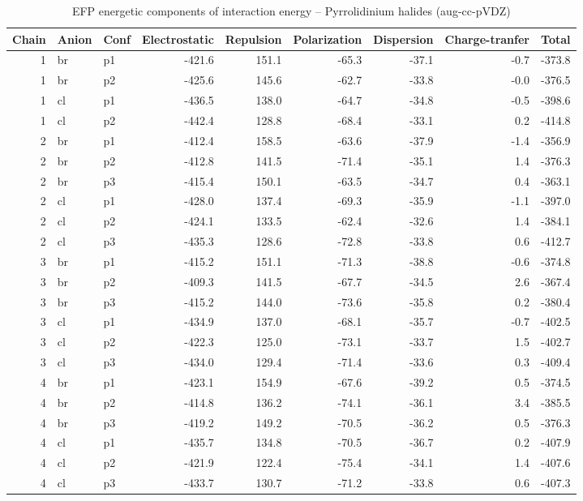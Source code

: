 \documentclass[a4paper]{article}
\begin{document}
\begin{table}[ht]
\centering
\footnotesize
\caption{EFP energetic components of interaction energy -- Pyrrolidinium halides (aug-cc-pVDZ)}
\begin{tabular}{rllrrrrrr}
  \hline
Chain & Anion & Conf & Electrostatic & Repulsion & Polarization & Dispersion & Charge-tranfer & Total \\ 
  \hline
 1 & br & p1 & -421.6 & 151.1 & -65.3 & -37.1 & -0.7 & -373.8 \\ 
   1 & br & p2 & -425.6 & 145.6 & -62.7 & -33.8 & -0.0 & -376.5 \\ 
   1 & cl & p1 & -436.5 & 138.0 & -64.7 & -34.8 & -0.5 & -398.6 \\ 
   1 & cl & p2 & -442.4 & 128.8 & -68.4 & -33.1 & 0.2 & -414.8 \\ 
   2 & br & p1 & -412.4 & 158.5 & -63.6 & -37.9 & -1.4 & -356.9 \\ 
   2 & br & p2 & -412.8 & 141.5 & -71.4 & -35.1 & 1.4 & -376.3 \\ 
   2 & br & p3 & -415.4 & 150.1 & -63.5 & -34.7 & 0.4 & -363.1 \\ 
   2 & cl & p1 & -428.0 & 137.4 & -69.3 & -35.9 & -1.1 & -397.0 \\ 
   2 & cl & p2 & -424.1 & 133.5 & -62.4 & -32.6 & 1.4 & -384.1 \\ 
   2 & cl & p3 & -435.3 & 128.6 & -72.8 & -33.8 & 0.6 & -412.7 \\ 
   3 & br & p1 & -415.2 & 151.1 & -71.3 & -38.8 & -0.6 & -374.8 \\ 
   3 & br & p2 & -409.3 & 141.5 & -67.7 & -34.5 & 2.6 & -367.4 \\ 
   3 & br & p3 & -415.2 & 144.0 & -73.6 & -35.8 & 0.2 & -380.4 \\ 
   3 & cl & p1 & -434.9 & 137.0 & -68.1 & -35.7 & -0.7 & -402.5 \\ 
   3 & cl & p2 & -422.3 & 125.0 & -73.1 & -33.7 & 1.5 & -402.7 \\ 
   3 & cl & p3 & -434.0 & 129.4 & -71.4 & -33.6 & 0.3 & -409.4 \\ 
   4 & br & p1 & -423.1 & 154.9 & -67.6 & -39.2 & 0.5 & -374.5 \\ 
   4 & br & p2 & -414.8 & 136.2 & -74.1 & -36.1 & 3.4 & -385.5 \\ 
   4 & br & p3 & -419.2 & 149.2 & -70.5 & -36.2 & 0.5 & -376.3 \\ 
   4 & cl & p1 & -435.7 & 134.8 & -70.5 & -36.7 & 0.2 & -407.9 \\ 
   4 & cl & p2 & -421.9 & 122.4 & -75.4 & -34.1 & 1.4 & -407.6 \\ 
   4 & cl & p3 & -433.7 & 130.7 & -71.2 & -33.8 & 0.6 & -407.3 \\ 
   \hline
\end{tabular}
\end{table}
\end{document}
